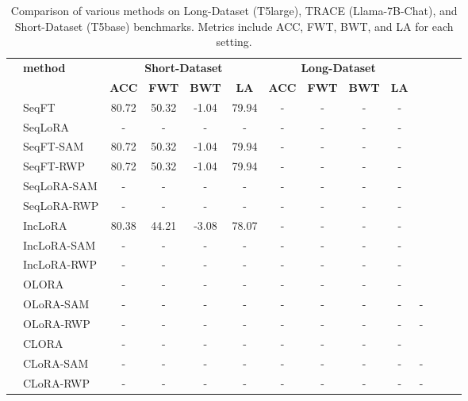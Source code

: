 \documentclass[letterpaper]{article} %
\begin{document}
\begin{table}[thbp]
\centering
\begin{tabular}{llcccccccccccc}
\toprule
 & \multirow{2}{*}{\textbf{method}} 
    & \multicolumn{4}{c}{\textbf{Short-Dataset}} 
    & \multicolumn{4}{c}{\textbf{Long-Dataset }} \\
\cmidrule(lr){3-6} \cmidrule(lr){7-10} 
 & & \textbf{ACC} & \textbf{FWT} & \textbf{BWT} & \textbf{LA}
   & \textbf{ACC} & \textbf{FWT} & \textbf{BWT} & \textbf{LA} \\
\midrule
\multirow{4}{*}{} 
    & SeqFT       & 80.72 & 50.32 & -1.04 & 79.94 & - & - & - & - \\
    & SeqLoRA     & - & - & - & - & - & - & - & -  \\
    & SeqFT-SAM       & 80.72 & 50.32 & -1.04 & 79.94 & - & - & - & - \\
    & SeqFT-RWP       & 80.72 & 50.32 & -1.04 & 79.94 & - & - & - & - \\
    & SeqLoRA-SAM     & - & - & - & - & - & - & - & -  \\
    & SeqLoRA-RWP     & - & - & - & - & - & - & - & -  \\
\midrule
\multirow{3}{*}{} 
    & IncLoRA    & 80.38 & 44.21 & -3.08 & 78.07 & - & - & - & - \\
    & IncLoRA-SAM & - & - & - & - & - & - & - & -  \\ 
    & IncLoRA-RWP & - & - & - & - & - & - & - & - \\
\midrule
\multirow{3}{*}{} 
    & OLORA       & - & - & - & - & - & - & - & -  \\ 
    & OLoRA-SAM & - & - & - & - & - & - & - & - & -  \\ 
    & OLoRA-RWP & - & - & - & - & - & - & - & - & - \\
\midrule
\multirow{3}{*}{} 
    & CLORA       & - & - & - & - & - & - & - & -  \\ 
    & CLoRA-SAM & - & - & - & - & - & - & - & - & -  \\ 
    & CLoRA-RWP & - & - & - & - & - & - & - & - & - \\
\bottomrule
\end{tabular}
\caption{Comparison of various methods on Long-Dataset (T5large), TRACE (Llama-7B-Chat), and Short-Dataset (T5base) benchmarks. Metrics include ACC, FWT, BWT, and LA for each setting.}
\label{tab:main_cl_benchmark}
\end{table}
\end{document}
